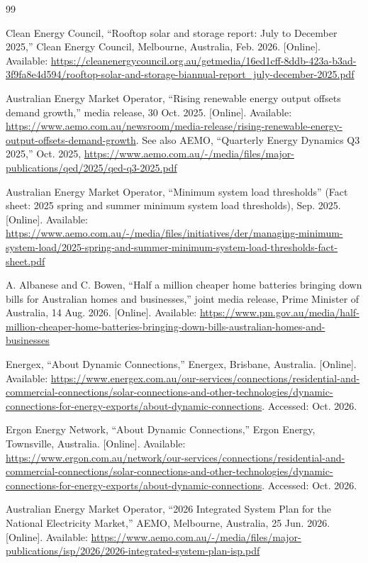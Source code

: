 \documentclass[11pt,a4paper]{article}
\begin{document}
\begin{thebibliography}{99}
\footnotesize
\setlength{\itemsep}{1pt}

 Clean Energy Council, ``Rooftop solar and storage report: July to December 2025,'' Clean Energy Council, Melbourne, Australia, Feb. 2026. [Online]. Available: \url{https://cleanenergycouncil.org.au/getmedia/16ed1cff-8ddb-423a-b3ad-3f9fa8e4d594/rooftop-solar-and-storage-biannual-report_july-december-2025.pdf}

 Australian Energy Market Operator, ``Rising renewable energy output offsets demand growth,'' media release, 30 Oct. 2025. [Online]. Available: \url{https://www.aemo.com.au/newsroom/media-release/rising-renewable-energy-output-offsets-demand-growth}. See also AEMO, ``Quarterly Energy Dynamics Q3 2025,'' Oct. 2025, \url{https://www.aemo.com.au/-/media/files/major-publications/qed/2025/qed-q3-2025.pdf}

 Australian Energy Market Operator, ``Minimum system load thresholds'' (Fact sheet: 2025 spring and summer minimum system load thresholds), Sep. 2025. [Online]. Available: \url{https://www.aemo.com.au/-/media/files/initiatives/der/managing-minimum-system-load/2025-spring-and-summer-minimum-system-load-thresholds-fact-sheet.pdf}

 A. Albanese and C. Bowen, ``Half a million cheaper home batteries bringing down bills for Australian homes and businesses,'' joint media release, Prime Minister of Australia, 14 Aug. 2026. [Online]. Available: \url{https://www.pm.gov.au/media/half-million-cheaper-home-batteries-bringing-down-bills-australian-homes-and-businesses}

 Energex, ``About Dynamic Connections,'' Energex, Brisbane, Australia. [Online]. Available: \url{https://www.energex.com.au/our-services/connections/residential-and-commercial-connections/solar-connections-and-other-technologies/dynamic-connections-for-energy-exports/about-dynamic-connections}. Accessed: Oct. 2026.

 Ergon Energy Network, ``About Dynamic Connections,'' Ergon Energy, Townsville, Australia. [Online]. Available: \url{https://www.ergon.com.au/network/our-services/connections/residential-and-commercial-connections/solar-connections-and-other-technologies/dynamic-connections-for-energy-exports/about-dynamic-connections}. Accessed: Oct. 2026.

 Australian Energy Market Operator, ``2026 Integrated System Plan for the National Electricity Market,'' AEMO, Melbourne, Australia, 25 Jun. 2026. [Online]. Available: \url{https://www.aemo.com.au/-/media/files/major-publications/isp/2026/2026-integrated-system-plan-isp.pdf}


\end{thebibliography}
\end{document}
